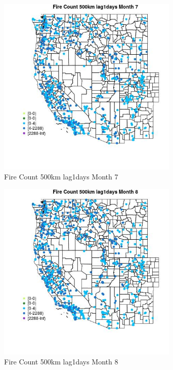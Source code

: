 \begin{figure} 
\centering  
\includegraphics[width=0.77\textwidth]{Code_Outputs/Report_ML_input_PM25_Step4_part_e_de_duplicated_aves_compiled_2019-05-21wNAs_MapObsMo7Fire_Count_500km_lag1days.jpg} 
\caption{\label{fig:Report_ML_input_PM25_Step4_part_e_de_duplicated_aves_compiled_2019-05-21wNAsMapObsMo7Fire_Count_500km_lag1days}Fire Count 500km lag1days Month 7} 
\end{figure} 
 

\begin{figure} 
\centering  
\includegraphics[width=0.77\textwidth]{Code_Outputs/Report_ML_input_PM25_Step4_part_e_de_duplicated_aves_compiled_2019-05-21wNAs_MapObsMo8Fire_Count_500km_lag1days.jpg} 
\caption{\label{fig:Report_ML_input_PM25_Step4_part_e_de_duplicated_aves_compiled_2019-05-21wNAsMapObsMo8Fire_Count_500km_lag1days}Fire Count 500km lag1days Month 8} 
\end{figure} 
 


